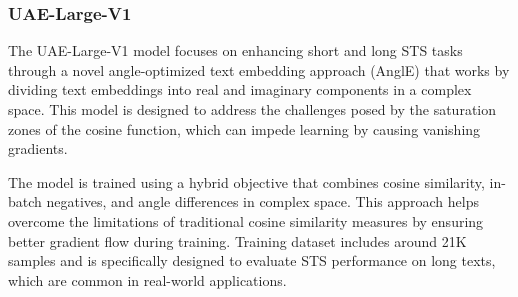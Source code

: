 
\subsubsection{UAE-Large-V1} \label{model-uae-large-v1}
The UAE-Large-V1 model \cite{li2023angle} focuses on enhancing short and long \ac{STS} tasks through a novel angle-optimized text embedding approach (AnglE) that works by dividing text embeddings into real and imaginary components in a complex space.
This model is designed to address the challenges posed by the saturation zones of the cosine function, which can impede learning by causing vanishing gradients.

The model is trained using a hybrid objective that combines cosine similarity, in-batch negatives, and angle differences in complex space.
This approach helps overcome the limitations of traditional cosine similarity measures by ensuring better gradient flow during training.
Training dataset includes around 21K samples and is specifically designed to evaluate \ac{STS} performance on long texts, which are common in real-world applications.

